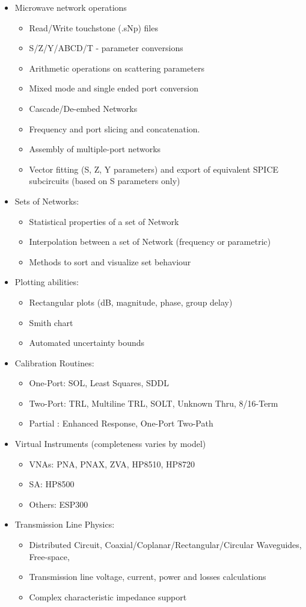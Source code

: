 \documentclass[10pt, letterpaper]{scrartcl}
\begin{document}
\begin{itemize}
	\item	Microwave network operations
	\begin{itemize}
	\item	Read/Write touchstone (.sNp) files
	\item	S/Z/Y/ABCD/T - parameter conversions
	\item	Arithmetic operations on scattering parameters
	\item   Mixed mode and single ended port conversion
	\item	Cascade/De-embed Networks
	\item	Frequency and port slicing and concatenation.
	\item   Assembly of multiple-port networks
	\item   Vector fitting (S, Z, Y parameters) and export of equivalent SPICE subcircuits (based on S parameters only)
	\end{itemize}
\item	Sets of Networks:
	\begin{itemize}
		\item Statistical properties of a set of Network
		\item Interpolation between a set of Network (frequency or parametric)
		\item Methods to sort and visualize set behaviour
	\end{itemize}
\item	Plotting abilities:
	\begin{itemize}
		\item Rectangular plots (dB, magnitude, phase, group delay)
		\item Smith chart
		\item Automated uncertainty bounds
	\end{itemize}
\item	Calibration Routines:
	\begin{itemize}
		\item One-Port: SOL, Least Squares, SDDL
		\item Two-Port: TRL, Multiline TRL, SOLT, Unknown Thru, 8/16-Term
		\item Partial : Enhanced Response, One-Port Two-Path
	\end{itemize}
\item	Virtual Instruments (completeness varies by model)
	\begin{itemize}
		\item VNAs: PNA, PNAX, ZVA, HP8510, HP8720
		\item SA: HP8500
		\item Others: ESP300
	\end{itemize}
\item	Transmission Line Physics:
	\begin{itemize}
		\item Distributed Circuit, Coaxial/Coplanar/Rectangular/Circular Waveguides, Free-space, 
		\item Transmission line voltage, current, power and losses calculations
		\item Complex characteristic impedance support
	\end{itemize}


\end{itemize}
\end{document}

